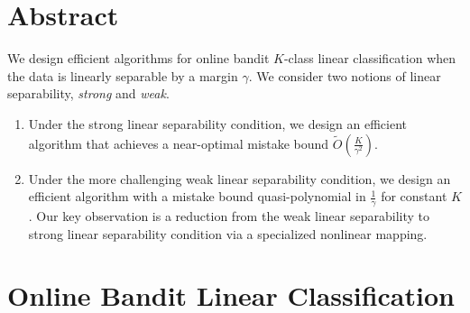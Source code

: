 \documentclass[landscape,a0a,final]{a0poster}
\begin{document}
\begin{multicols}{3} %

\vspace{-15pt}

\section*{Abstract}
We design efficient algorithms for online bandit $K$-class linear classification when the data is
linearly separable by a margin $\gamma$. We consider two notions of linear separability,
\emph{strong} and \emph{weak}.
\begin{enumerate}
\item Under the strong linear separability condition, we design an efficient
algorithm that achieves a near-optimal mistake bound $\tilde{O}(\frac{K}{\gamma^2})$.

\item Under the more challenging weak linear separability condition, we design
an efficient algorithm with a mistake bound quasi-polynomial in $\frac{1}{\gamma}$
for constant $K$. Our key observation is a reduction from the weak linear separability
to strong linear separability condition via a specialized nonlinear mapping.
\end{enumerate}

\vspace*{1.5cm}
\section*{Online Bandit Linear Classification}





\end{multicols}
\end{document}
